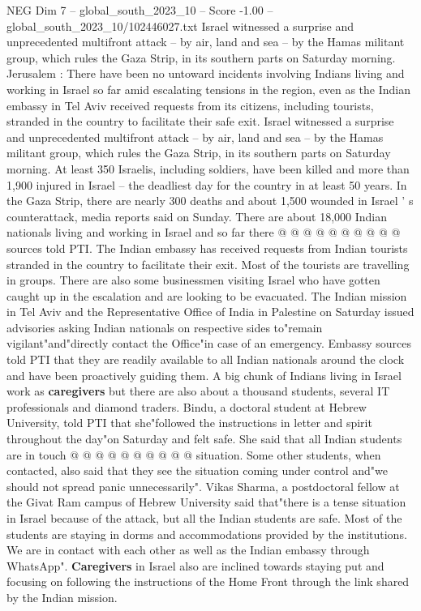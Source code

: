 \begin{textsample}{NEG Dim 7 – global\_south\_2023\_10 – Score -1.00 – global\_south\_2023\_10/102446027.txt}  \label{ex:f7_neg_066}
Israel witnessed a surprise and unprecedented multifront attack -- by air, land and sea -- by the Hamas militant group, which rules the Gaza Strip, in its southern parts on Saturday morning.
Jerusalem : There have been no untoward incidents involving Indians living and working in Israel so far amid escalating tensions in the region, even as the Indian embassy in Tel Aviv received requests from its citizens, including tourists, stranded in the country to facilitate their safe exit.
Israel witnessed a surprise and unprecedented multifront attack -- by air, land and sea -- by the Hamas militant group, which rules the Gaza Strip, in its southern parts on Saturday morning.
At least 350 Israelis, including soldiers, have been killed and more than 1,900 injured in Israel -- the deadliest day for the country in at least 50 years.
In the Gaza Strip, there are nearly 300 deaths and about 1,500 wounded in Israel ' s counterattack, media reports said on Sunday.
There are about 18,000 Indian nationals living and working in Israel and so far there @ @ @ @ @ @ @ @ @ @ sources told PTI.
The Indian embassy has received requests from Indian tourists stranded in the country to facilitate their exit.
Most of the tourists are travelling in groups.
There are also some businessmen visiting Israel who have gotten caught up in the escalation and are looking to be evacuated.
The Indian mission in Tel Aviv and the Representative Office of India in Palestine on Saturday issued advisories asking Indian nationals on respective sides to"remain vigilant"and"directly contact the Office"in case of an emergency.
Embassy sources told PTI that they are readily available to all Indian nationals around the clock and have been proactively guiding them.
A big chunk of Indians living in Israel work as \textbf{caregivers} but there are also about a thousand students, several IT professionals and diamond traders.
Bindu, a doctoral student at Hebrew University, told PTI that she"followed the instructions in letter and spirit throughout the day"on Saturday and felt safe.
She said that all Indian students are in touch @ @ @ @ @ @ @ @ @ @ situation.
Some other students, when contacted, also said that they see the situation coming under control and"we should not spread panic unnecessarily".
Vikas Sharma, a postdoctoral fellow at the Givat Ram campus of Hebrew University said that"there is a tense situation in Israel because of the attack, but all the Indian students are safe.
Most of the students are staying in dorms and accommodations provided by the institutions.
We are in contact with each other as well as the Indian embassy through WhatsApp". \textbf{Caregivers} in Israel also are inclined towards staying put and focusing on following the instructions of the Home Front through the link shared by the Indian mission.

\end{textsample}
